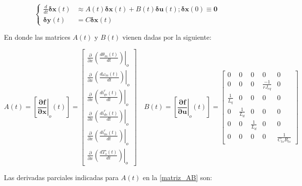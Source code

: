 \documentclass[a4paper, 10pt, onecolumn,journal]{ieeeconf}
\begin{document}
\begin{equation}
    \begin{cases}
        \frac{d}{dt} \mathbf{\delta x}(t) &\approx A(t) \mathbf{\delta x}(t) + B(t) \mathbf{\delta u}(t); \mathbf{\delta x}(0) \equiv \mathbf{0}\\
        \mathbf{\delta y}(t) &= C\mathbf{\delta x}(t)
    \end{cases}
    \label{modelo de pequeñas desviaciones}
\end{equation}

En donde las matrices $A(t)$ y $B(t)$  vienen dadas por la siguiente:

\begin{equation}
    A(t) = \left[ \left. \frac{\mathbf{\partial f}}{\mathbf{\partial x}} \right|_{o}(t) \right] =
    \begin{bmatrix}
        \left.\frac{\partial}{\partial x}\left( \frac{d \theta_m(t)}{dt}\right)\right|_{o} \\ 
        \left.\frac{\partial}{\partial x}\left( \frac{d \omega_m(t)}{dt}\right)\right|_{o} \\
        \left.\frac{\partial}{\partial x}\left( \frac{d i^r_{qs}(t)}{dt}\right)\right|_{o} \\ 
        \left.\frac{\partial}{\partial x}\left( \frac{d i^r_{ds}(t)}{dt}\right)\right|_{o} \\ 
        \left.\frac{\partial}{\partial x}\left( \frac{d i^r_{0s}(t)}{dt}\right)\right|_{o} \\ 
        \left.\frac{\partial}{\partial x}\left( \frac{d T^\circ_s(t)}{dt}\right)\right|_{o} 
    \end{bmatrix}\quad
    B(t) = \left[ \left. \frac{\mathbf{\partial f}}{\mathbf{\partial u}} \right|_{o}(t) \right] =
    \begin{bmatrix}
        0 & 0 & 0 & 0 & 0\\
        0 & 0 & 0 & \frac{-1}{r J_{eq}} & 0\\
        \frac{1}{L_q} & 0 & 0 & 0 & 0\\
        0 & \frac{1}{L_d} & 0 & 0 & 0\\
        0 & 0 & \frac{1}{L_d} & 0 & 0\\
        0 & 0 & 0 & 0 & \frac{1}{C_{ts} R_{ts}}
    \end{bmatrix}
    \label{matriz_AB}
\end{equation}

Las derivadas parciales indicadas para $A(t)$ en la \cref{matriz_AB} son:
\end{document}
